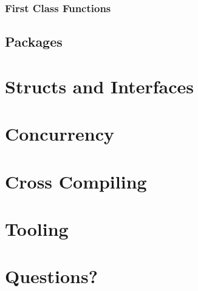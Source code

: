 \documentclass{beamer}
\begin{document}
\begin{frame}
  \frametitle{First Class Functions}

\end{frame}


\subsection{Packages}

\section{Structs and Interfaces}

\section{Concurrency}

\section{Cross Compiling}

\section{Tooling}

\section{Questions?}
\end{document}
